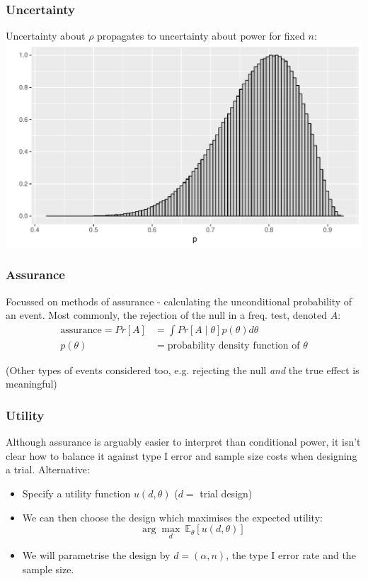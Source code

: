 \documentclass{beamer}
\begin{document}
\begin{frame}
\frametitle{Uncertainty}
Uncertainty about $\rho$ propagates to uncertainty about power for fixed $n$:\\
\vspace{3mm}
\centering
\includegraphics[scale=0.45]{prior_power}
\end{frame}


\begin{frame}
\frametitle{Assurance}
Focussed on methods of assurance - calculating the unconditional probability of an event. Most commonly, the rejection of the null in a freq. test, denoted $A$:
\begin{align*}
\text{assurance} = Pr[A] &= \int Pr[A \mid \theta]p(\theta) d\theta \\
 p(\theta) &= \text{probability density function of } \theta
\end{align*}

(Other types of events considered too, e.g. rejecting the null \emph{and} the true effect is meaningful)
\end{frame}

\begin{frame}
\frametitle{Utility}
Although assurance is arguably easier to interpret than conditional power, it isn't clear how to balance it against type I error and sample size costs when designing a trial. Alternative:

\begin{itemize}
\item Specify a utility function $u(d, \theta)$ ($d = $ trial design)
\item{ We can then choose the design which maximises the expected utility:
	\begin{equation}
	\arg\max_{d} ~ \mathbb{E}_{\theta}[u(d, \theta)]
	\end{equation}}
\item We will parametrise the design by $d = (\alpha, n)$, the type I error rate and the sample size.
\end{itemize}
\end{frame}
\end{document}
